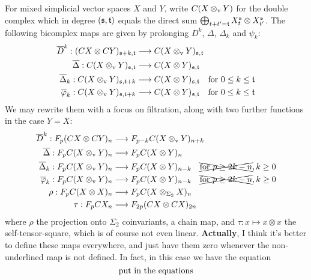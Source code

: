 \documentclass[10pt]{article}
\begin{document}
\begin{Adams sseq operations}
For mixed simplicial vector spaces $X$ and $Y$, write $C(X\otimes_\textup{v}Y)$ for the double complex which in degree $(\fraks,\frakt)$ equals the direct sum $\bigoplus_{t+t'=\frakt}X_t^\fraks\otimes X_{t'}^\fraks$. The following bicomplex maps are given by prolonging $D^k$, $\Delta$, $\Delta_k$ and $\psi_k$:
\begin{align*}
\overline{D}^k:(CX\otimes CY)_{\fraks+k,\frakt}&\to C(X\otimes_\textup{v}Y)_{\fraks,\frakt}\\
\overline{\Delta}:C(X\otimes_\textup{v} Y)_{\fraks,\frakt}&\to C(X\otimes Y)_{\fraks,\frakt}\\
\overline{\Delta}_k:C(X\otimes_\textup{v} Y)_{\fraks,\frakt+k}&\to C(X\otimes Y)_{\fraks,\frakt}\textup{\quad for $0\leq k\leq \frakt$}\\
\overline{\phi}_k:C(X\otimes_\textup{v} Y)_{\fraks,\frakt+k}&\to C(X\otimes Y)_{\fraks,\frakt}\textup{\quad for $0\leq k\leq \frakt$}
\end{align*}
We may rewrite them with a focus on filtration, along with two further functions in the case $Y=X$:
\begin{align*}
\overline{D}^k:F_{p}(CX\otimes CY)_{n}&\to F_{p-k}C(X\otimes_\textup{v}Y)_{n+k}\\
\overline{\Delta}:F_{p}C(X\otimes_\textup{v} Y)_{n}&\to F_{p}C(X\otimes Y)_{n}\\
\overline{\Delta}_k:F_{p}C(X\otimes_\textup{v} Y)_{n}&\to F_{p}C(X\otimes Y)_{n-k}\textup{\quad \xcancel{for $p\geq 2k-n$},\,$k\geq0$}\\
\overline{\phi}_k:F_{p}C(X\otimes_\textup{v} Y)_{n}&\to F_{p}C(X\otimes Y)_{n-k}\textup{\quad \xcancel{for $p\geq 2k-n$},\,$k\geq0$}\\
\rho:F_{p}C(X\otimes X)_{n}&\to F_{p}C(X\otimes_{\Sigma_2} X)_{n}\\
\tau:F_{p}CX_n&\to F_{2p}(CX\otimes CX)_{2n}
\end{align*}
where $\rho$ the projection onto $\Sigma_2$ coinvariants, a chain map, and $\tau:x\mapsto x\otimes x$ the self-tensor-square, which is of course not even linear. \textbf{Actually}, I think it's better to define these maps everywhere, and just have them zero whenever the non-underlined map is not defined. In fact, in this case we have the equation
\[\textup{put in the equations}\]



\end{Adams sseq operations}
\end{document}
